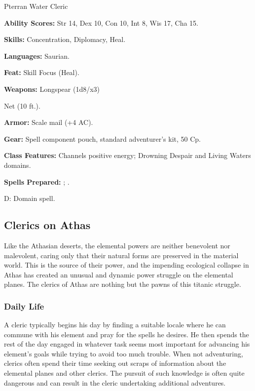 Pterran Water Cleric

\textbf{Ability Scores:} Str 14, Dex 10, Con 10, Int 8, Wis 17, Cha 15.

\textbf{Skills:} Concentration, Diplomacy, Heal.

\textbf{Languages:} Saurian.

\textbf{Feat:} Skill Focus (Heal).

\textbf{Weapons:} Longspear (1d8/x3)

Net (10 ft.).

\textbf{Armor:} Scale mail (+4 AC).

\textbf{Gear:} Spell component pouch, standard adventurer's kit, 50 Cp.

\textbf{Class Features:} Channels positive energy; Drowning Despair and Living Waters domains.

\textbf{Spells Prepared:} ; .

D: Domain spell.

\subsection{Clerics on Athas}

Like the Athasian deserts, the elemental powers are neither benevolent nor malevolent, caring only that their natural forms are preserved in the material world. This is the source of their power, and the impending ecological collapse in Athas has created an unusual and dynamic power struggle on the elemental planes. The clerics of Athas are nothing but the pawns of this titanic struggle.

\subsubsection{Daily Life}

A cleric typically begins his day by finding a suitable locale where he can commune with his element and pray for the spells he desires. He then spends the rest of the day engaged in whatever task seems most important for advancing his element's goals while trying to avoid too much trouble. When not adventuring, clerics often spend their time seeking out scraps of information about the elemental planes and other clerics. The pursuit of such knowledge is often quite dangerous and can result in the cleric undertaking additional adventures.


